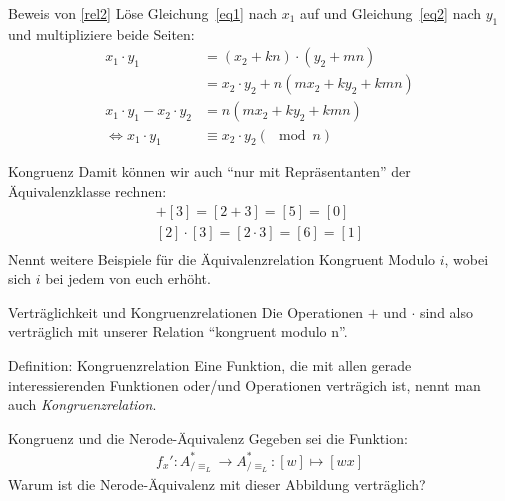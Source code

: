 \begin{frame}{Beweis von \eqref{rel2}}
    Löse Gleichung~\eqref{eq1} nach $x_1$ auf und Gleichung~\eqref{eq2} nach $y_1$ und multipliziere beide Seiten:
    \begin{align*}
        x_1 \cdot y_1 &= \left( x_2 + kn \right) \cdot \left( y_2 + mn \right)\\
                        &= x_2 \cdot y_2 + n\left( mx_2 + ky_2 + kmn \right)\\
        x_1 \cdot y_1 - x_2 \cdot y_2  &= n\left( mx_2 + ky_2 + kmn \right)\\
            \Longleftrightarrow x_1\cdot y_1 &\equiv x_2 \cdot y_2 \left( \mod n \right)
    \end{align*}
\end{frame}
\begin{frame}{Kongruenz}
    Damit können wir auch ``nur mit Repräsentanten'' der Äquivalenzklasse rechnen:
    \begin{align*}
        [2] + [3] = [2 + 3] = [5] = [0]\\
        [2] \cdot [3] = [2 \cdot 3] = [6] = [1]\\
    \end{align*}
    Nennt weitere Beispiele für die Äquivalenzrelation Kongruent Modulo $i$, wobei sich $i$ bei jedem von euch erhöht.
\end{frame}
\begin{frame}{Verträglichkeit und Kongruenzrelationen}
    Die Operationen $+$ und $\cdot$ sind also verträglich mit unserer Relation ``kongruent modulo n''.\\
    \begin{block}{Definition: Kongruenzrelation}
        Eine Funktion, die mit allen gerade interessierenden Funktionen oder/und Operationen verträgich ist, nennt man auch \emph{Kongruenzrelation}.
    \end{block}
\end{frame}
\begin{frame}{Kongruenz und die Nerode-Äquivalenz}
    Gegeben sei die Funktion:
    \begin{align*}
        f_x': A_{/\equiv_L}^* \rightarrow A_{/\equiv_L}^*: [w]\mapsto [wx]
    \end{align*}
    Warum ist die Nerode-Äquivalenz mit dieser Abbildung verträglich?
\end{frame}
